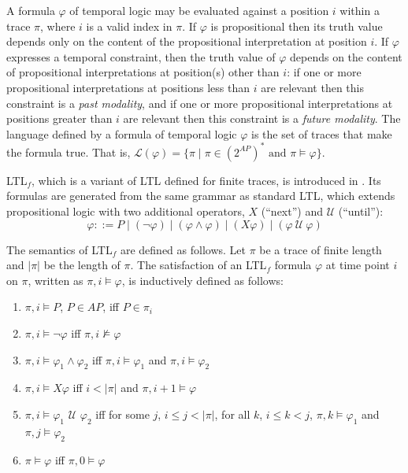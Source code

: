 \documentclass{lmcs}
\theoremstyle{definition}
\DeclareMathOperator{\?}{?}
\begin{document}
A formula $\varphi$ of temporal logic may be evaluated against a
position $i$ within a trace $\pi$, where $i$ is a valid index in $\pi$.
If $\varphi$ is propositional then its truth value depends only on the content of the propositional interpretation
at position $i$. If $\varphi$ expresses a temporal constraint, then the truth value of $\varphi$ depends on the
content of propositional interpretations at position(s) other than $i$: if one or more propositional interpretations at positions less than $i$
are relevant then this constraint is a \textit{past modality}, and if one or more propositional interpretations at positions greater than $i$ are
relevant then this constraint is a \textit{future modality}.
The language defined by a formula of temporal logic $\varphi$ is the set of traces that make the formula true. That is,
$\mathcal{L}(\varphi) = \{ \pi \mid \pi \in (2^{AP})^* \text{ and } \pi \models \varphi \}$.

LTL$_f$, which is a variant of LTL defined for finite traces, is introduced in \cite{ldlf}. Its formulas are generated from the same grammar as standard LTL, which extends propositional logic with two additional operators, $X$ (``next'') and $\mathcal{U}$ (``until''):
\[ \varphi::= P \mid (\neg\varphi) \mid (\varphi \wedge \varphi) \mid (X\varphi) \mid (\varphi\ \mathcal{U}\ \varphi) \]

The semantics of LTL$_f$ are defined as follows. Let $\pi$ be a trace of finite length and $|\pi|$ be the length of $\pi$. The satisfaction of an LTL$_f$ formula $\varphi$ at time point $i$ on $\pi$, written as $\pi,i \models \varphi$, is inductively defined as follows:
\begin{enumerate}
    \item $\pi,i \models P$, $P \in AP$, iff $P \in \pi_i$
    \item $\pi,i \models \neg\varphi$ iff $\pi,i \not\models \varphi$
    \item $\pi,i \models \varphi_1 \wedge \varphi_2$ iff $\pi,i \models \varphi_1$ and $\pi,i \models \varphi_2$
    \item $\pi,i \models X\varphi$ iff $i < |\pi|$ and $\pi,i+1 \models \varphi$
    \item $\pi,i \models \varphi_1 $ $ \mathcal{U} $ $  \varphi_2$ iff for some $j$, $i \leq j < |\pi|$, for all $k$, $i \leq k < j$, $\pi,k \models \varphi_1$ and $\pi,j \models \varphi_2$
    \item $\pi \models \varphi$ iff $\pi,0 \models \varphi$
\end{enumerate}
\end{document}
